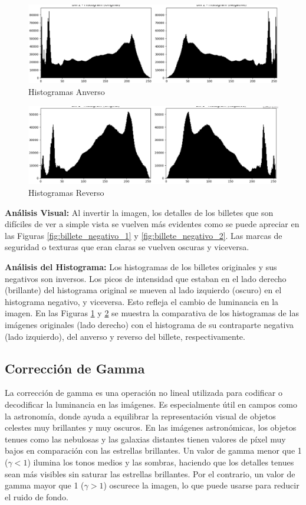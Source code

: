 \documentclass[12pt,letterpaper]{article}
\begin{document}
\begin{figure}[H]
  \centering
  \includegraphics[width=0.5\linewidth]{figuras/histograma_negativo1.png}
  \caption{Histogramas Anverso}
  \label{fig:histograma_negativo1}
\end{figure}

\begin{figure}[H]
  \centering
  \includegraphics[width=0.5\linewidth]{figuras/histograma_negativo2.png}
  \caption{Histogramas Reverso}
  \label{fig:histograma_negativo2}
\end{figure}

\textbf{Análisis Visual:} Al invertir la imagen, los detalles de los billetes que son difíciles de ver a simple vista se vuelven más evidentes como se puede apreciar en las Figuras \ref{fig:billete_negativo_1} y \ref{fig:billete_negativo_2}. Las marcas de seguridad o texturas que eran claras se vuelven oscuras y viceversa.

\textbf{Análisis del Histograma:} Los histogramas de los billetes originales y sus negativos son inversos. Los picos de intensidad que estaban en el lado derecho (brillante) del histograma original se mueven al lado izquierdo (oscuro) en el histograma negativo, y viceversa. Esto refleja el cambio de luminancia en la imagen. En las Figuras \ref{fig:histograma_negativo1} y \ref{fig:histograma_negativo2} se muestra la comparativa de los histogramas de las imágenes originales (lado derecho) con el histograma de su contraparte negativa (lado izquierdo), del anverso y reverso del billete, respectivamente.

\subsection{Corrección de Gamma}

La corrección de gamma es una operación no lineal utilizada para codificar o decodificar la luminancia en las imágenes. Es especialmente útil en campos como la astronomía, donde ayuda a equilibrar la representación visual de objetos celestes muy brillantes y muy oscuros.
En las imágenes astronómicas, los objetos tenues como las nebulosas y las galaxias distantes tienen valores de píxel muy bajos en comparación con las estrellas brillantes. Un valor de gamma menor que 1 ($\gamma < 1$) ilumina los tonos medios y las sombras, haciendo que los detalles tenues sean más visibles sin saturar las estrellas brillantes. Por el contrario, un valor de gamma mayor que 1 ($\gamma > 1$) oscurece la imagen, lo que puede usarse para reducir el ruido de fondo.
\end{document}
